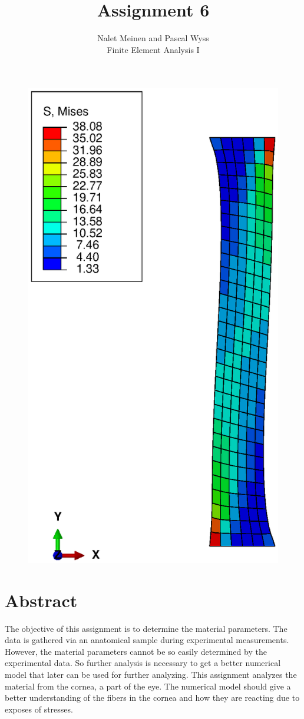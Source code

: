 \documentclass[12pt]{article}
\begin{document}


\title{Assignment 6}%
\author{Nalet Meinen and Pascal Wyss\\ %
Finite Element Analysis I
}
\maketitle

\begin{figure}[!htb]
  \centering
  \vspace*{1cm}
  \includegraphics[trim={50mm 20mm 50mm 20mm},clip,width=0.35\linewidth]{pics/s_mises_30}
  \label{fig:0}
\end{figure}

\newpage

\section*{Abstract}
The objective of this assignment is to determine the material parameters. The data is gathered via an anatomical sample during experimental measurements. However, the material parameters cannot be so easily determined by the experimental data. So further analysis is necessary to get a better numerical model that later can be used for further analyzing.
This assignment analyzes the material from the cornea, a part of the eye. The numerical model should give a better understanding of the fibers in the cornea and how they are reacting due to exposes of stresses.
\end{document}
